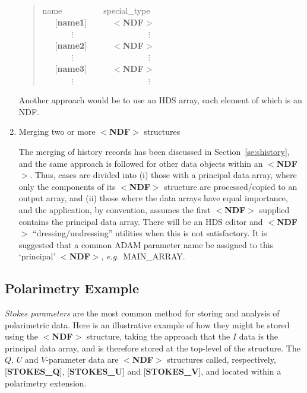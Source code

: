 \documentclass[twoside,11pt]{article}
\newenvironment{latexonly}{}{}
\newcommand{\htmlref}[2]{#1}
\newcommand{\html}[1]{}
\newcommand{\latex}[1]{#1}
\newcommand{\xlabel}[1]{}
\begin{document}
\begin{enumerate}
\begin{latexonly}
\begin{tabbing}
\end{tabbing}
\end{latexonly}

\begin{htmlonly}
\begin{quote}

name~~~~~~~~~~special\_type\\
~~~{[}{\bf name1}{]}~~~~~~$<${\bf NDF}$>$ \\
~~~~~~~$\vdots$~~~~~~~~~~~~~~~~~~$\vdots$\- \\
~~~{[}{\bf name2}{]}~~~~~~$<${\bf NDF}$>$ \\
~~~~~~~$\vdots$~~~~~~~~~~~~~~~~~~$\vdots$\- \\
~~~{[}{\bf name3}{]}~~~~~~$<${\bf NDF}$>$ \\
~~~~~~~$\vdots$~~~~~~~~~~~~~~~~~~$\vdots$\- \\

\end{quote}
\end{htmlonly}

Another approach would be to use an HDS array, each
element of which is an NDF.

\item Merging two or more $<${\bf NDF}$>$ structures

The merging of history records has been discussed 
in \latex{Section~\ref{se:shistory},}\html{\htmlref{$<${\bf
HISTORY}$>$ Structure,}{se:shistory}} and the same approach
is followed for other data objects within an $<${\bf NDF}$>$.
Thus, cases are divided into (i)
those with a principal data array, where only the
components of its $<${\bf NDF}$>$ structure are
processed/copied to an output array, and
(ii) those where the
data arrays have equal importance, and
the application, by convention, assumes the first $<${\bf NDF}$>$ supplied
contains the
principal data array.  There will be an HDS editor and $<${\bf NDF}$>$
``dressing/undressing'' utilities when this is not satisfactory.  It is
suggested that a common {\small ADAM} parameter name be assigned to this `principal'
$<${\bf NDF}$>$, {\it e.g.}\  MAIN\_ARRAY.
\end{enumerate}

\xlabel{se_expolarimetry}\subsection{Polarimetry Example\label{se:expolarimetry}}

{\it Stokes parameters} are the most common method for storing and analysis
of polarimetric data.  Here is an illustrative
example of how they might be stored
using the $<${\bf NDF}$>$ structure, taking the approach that
the $I$ data is the principal data array, and is therefore
stored at the top-level of the structure.  The $Q$, $U$ and $V$-parameter data
are $<${\bf NDF}$>$ structures called, respectively,
{[}{\bf STOKES\_Q}{]}, {[}{\bf STOKES\_U}{]}
and {[}{\bf STOKES\_V}{]}, and
located within a polarimetry extension.
\end{document}
